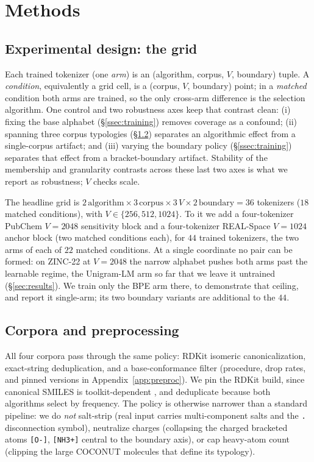 \documentclass{article}
\begin{document}
\section{Methods}\label{sec:methods}

\subsection{Experimental design: the grid}\label{ssec:grid}

Each trained tokenizer (one \emph{arm}) is an (algorithm, corpus, $V$,
boundary) tuple. A \emph{condition}, equivalently a grid cell, is a
(corpus, $V$, boundary) point; in a \emph{matched} condition both arms are
trained, so the only cross-arm difference is the selection algorithm. One control and two
robustness axes keep that contrast clean: (i) fixing the base alphabet
(\S\ref{ssec:training}) removes coverage as a confound; (ii) spanning three
corpus typologies (\S\ref{ssec:corpora}) separates an algorithmic effect from a
single-corpus artifact; and (iii) varying the boundary policy
(\S\ref{ssec:training}) separates that effect from a bracket-boundary artifact.
Stability of the membership and granularity contrasts across these last two axes
is what we report as robustness; $V$ checks scale.

The headline grid is $2\,\text{algorithm} \times 3\,\text{corpus} \times
3\,V \times 2\,\text{boundary} = 36$ tokenizers ($18$ matched
conditions), with $V \in \{256, 512, 1024\}$. To it we add a four-tokenizer
PubChem $V{=}2048$ sensitivity block and a four-tokenizer REAL-Space $V{=}1024$
anchor block (two matched conditions each), for $44$ trained tokenizers, the
two arms of each of $22$ matched conditions. At a single
coordinate no pair can be formed: on ZINC-22 at $V{=}2048$ the narrow alphabet
pushes both arms past the learnable regime, the Unigram-LM arm so far that we
leave it untrained (\S\ref{sec:results}). We train only the BPE arm there, to
demonstrate that ceiling, and report it single-arm; its two boundary variants
are additional to the $44$.

\subsection{Corpora and preprocessing}\label{ssec:corpora}

All four corpora pass through the same policy: RDKit \citep{rdkit2026} isomeric
canonicalization, exact-string deduplication, and a base-conformance filter
(procedure, drop rates, and pinned versions in Appendix~\ref{app:preproc}). We
pin the RDKit build, since canonical SMILES is toolkit-dependent
\citep{oboyle2012universal}, and deduplicate because both algorithms select by
frequency. The policy is otherwise narrower than a standard pipeline: we do
\emph{not} salt-strip (real input carries multi-component salts and the
\texttt{.} disconnection symbol), neutralize charges
(collapsing the charged bracketed atoms \texttt{[O-]}, \texttt{[NH3+]} central to
the boundary axis), or cap heavy-atom count (clipping the large COCONUT molecules
that define its typology).
\end{document}
